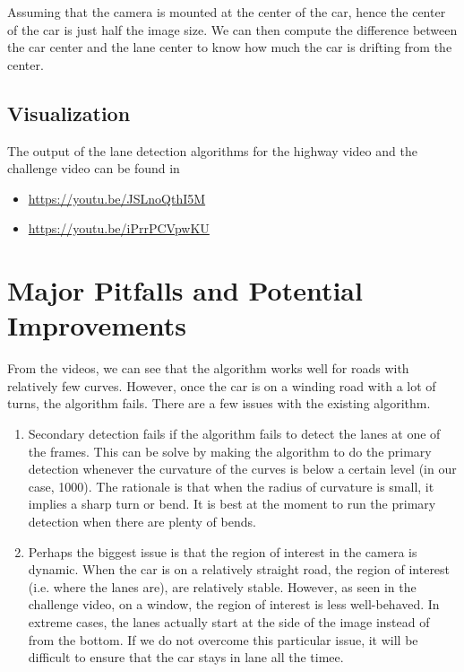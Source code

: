 \documentclass[12pt,twoside]{article}
\begin{document}
Assuming that the camera is mounted at the center of the car, hence the center of the car is just half the image size. We can then compute the difference between the car center and the lane center to know how much the car is drifting from the center.


\subsection{Visualization}
The output of the lane detection algorithms for the highway video and the challenge video can be found in
\begin{itemize}
	\item \url{https://youtu.be/JSLnoQthI5M}
	\item \url{https://youtu.be/iPrrPCVpwKU}
\end{itemize}

\newpage

\section{Major Pitfalls and Potential Improvements}
From the videos, we can see that the algorithm works well for roads with relatively few curves. However, once the car is on a winding road with a lot of turns, the algorithm fails. There are a few issues with the existing algorithm.

\begin{enumerate}
	\item Secondary detection fails if the algorithm fails to detect the lanes at one of the frames. This can be solve by making the algorithm to do the primary detection whenever the curvature of the curves is below a certain level (in our case, 1000). The rationale is that when the radius of curvature is small, it implies a sharp turn or bend. It is best at the moment to run the primary detection when there are plenty of bends.
	
	\item Perhaps the biggest issue is that the region of interest in the camera is dynamic. When the car is on a relatively straight road, the region of interest (i.e. where the lanes are), are relatively stable. However, as seen in the challenge video, on a window, the region of interest is less well-behaved. In extreme cases, the lanes actually start at the side of the image instead of from the bottom. If we do not overcome this particular issue, it will be difficult to ensure that the car stays in lane all the timee.
\end{enumerate}
\end{document}
